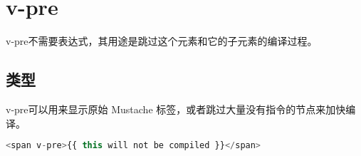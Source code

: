 \begin{lstlisting}[language=JavaScript]

\end{lstlisting}




\begin{lstlisting}[language=JavaScript]

\end{lstlisting}

\section{v-pre}



v-pre不需要表达式，其用途是跳过这个元素和它的子元素的编译过程。

\subsection{类型}

v-pre可以用来显示原始 Mustache 标签，或者跳过大量没有指令的节点来加快编译。


\begin{lstlisting}[language=JavaScript]
<span v-pre>{{ this will not be compiled }}</span>
\end{lstlisting}



\begin{lstlisting}[language=JavaScript]

\end{lstlisting}




\begin{lstlisting}[language=JavaScript]

\end{lstlisting}




\begin{lstlisting}[language=JavaScript]

\end{lstlisting}




\begin{lstlisting}[language=JavaScript]

\end{lstlisting}




\begin{lstlisting}[language=JavaScript]

\end{lstlisting}





